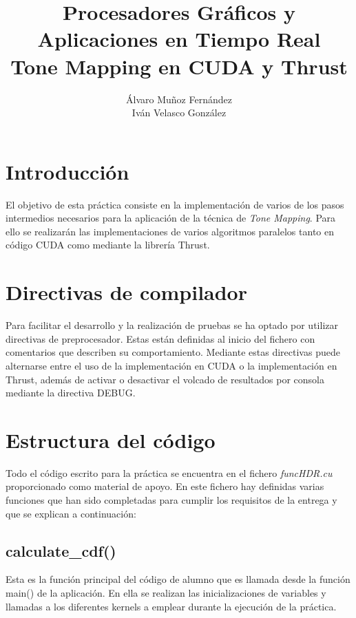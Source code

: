 \documentclass[10pt,oneside,a4paper]{article}
\begin{document}
\begin{titlepage}

\title{\Huge Procesadores Gráficos y Aplicaciones en Tiempo Real  \\[0.7in] \LARGE Tone Mapping en CUDA y Thrust\\[3.6in]}
\date{}
\author{Álvaro Muñoz Fernández\\
Iván Velasco González}
\maketitle
\thispagestyle{empty}
\end{titlepage}
\newpage
\tableofcontents
\newpage

\section{Introducción}
El objetivo de esta práctica consiste en la implementación de varios de los pasos intermedios necesarios para la aplicación de la técnica de \textit{Tone Mapping}. Para ello se realizarán las implementaciones de varios algoritmos paralelos tanto en código CUDA como mediante la librería Thrust.\\

\section{Directivas de compilador}
Para facilitar el desarrollo y la realización de pruebas se ha optado por utilizar directivas de preprocesador. Estas están definidas al inicio del fichero con comentarios que describen su comportamiento. Mediante estas directivas puede alternarse entre el uso de la implementación en CUDA o la implementación en Thrust, además de activar o desactivar el volcado de resultados por consola mediante la directiva DEBUG.

\section{Estructura del código}
Todo el código escrito para la práctica se encuentra en el fichero \textit{funcHDR.cu} proporcionado como material de apoyo. En este fichero hay definidas varias funciones que han sido completadas para cumplir los requisitos de la entrega y que se explican a continuación:

\subsection{calculate\_cdf()}
Esta es la función principal del código de alumno que es llamada desde la función main() de la aplicación. En ella se realizan las inicializaciones de variables y llamadas a los diferentes kernels a emplear durante la ejecución de la práctica.\\
\end{document}
